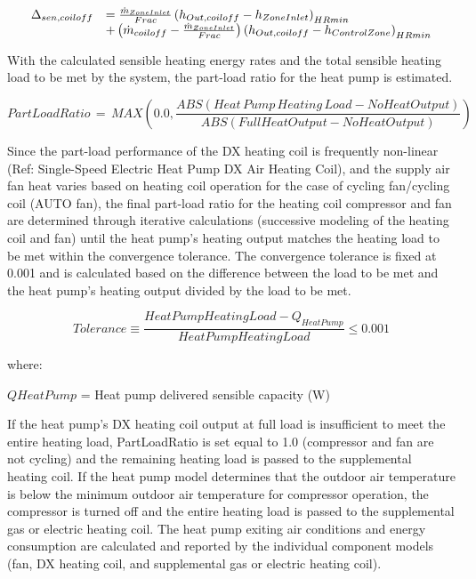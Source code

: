 \begin{equation}
  \begin{array}{rl}
    \Delta_{sen,coil off} &= \frac{\dot{m}_{ZoneInlet}}{Frac} \PB{h_{Out,coil off} - h_{ZoneInlet}}_{HRmin} \\
                           &+ \PB{\dot{m}_{coil off} - \frac{\dot{m}_{ZoneInlet}}{Frac}} \PB{h_{Out,coil off} - h_{ControlZone}}_{HRmin}
  \end{array}
\end{equation}

With the calculated sensible heating energy rates and the total sensible heating load to be met by the system, the part-load ratio for the heat pump is estimated.

\begin{equation}
PartLoadRatio\, = \,MAX\left( {0.0,\frac{{ABS\left( {Heat\,Pump\,Heating\,Load - NoHeatOutput} \right)}}{{ABS\left( {FullHeatOutput - NoHeatOutput} \right)}}} \right)
\end{equation}

Since the part-load performance of the DX heating coil is frequently non-linear (Ref: Single-Speed Electric Heat Pump DX Air Heating Coil), and the supply air fan heat varies based on heating coil operation for the case of cycling fan/cycling coil (AUTO fan), the final part-load ratio for the heating coil compressor and fan are determined through iterative calculations (successive modeling of the heating coil and fan) until the heat pump's heating output matches the heating load to be met within the convergence tolerance. The convergence tolerance is fixed at 0.001 and is calculated based on the difference between the load to be met and the heat pump's heating output divided by the load to be met.

\begin{equation}
  Tolerance \equiv \frac{HeatPumpHeatingLoad - Q_{HeatPump}}{HeatPumpHeatingLoad} \leq 0.001
\end{equation}

where:

\(QHeatPump\) = Heat pump delivered sensible capacity (W)

If the heat pump's DX heating coil output at full load is insufficient to meet the entire heating load, PartLoadRatio is set equal to 1.0 (compressor and fan are not cycling) and the remaining heating load is passed to the supplemental heating coil. If the heat pump model determines that the outdoor air temperature is below the minimum outdoor air temperature for compressor operation, the compressor is turned off and the entire heating load is passed to the supplemental gas or electric heating coil. The heat pump exiting air conditions and energy consumption are calculated and reported by the individual component models (fan, DX heating coil, and supplemental gas or electric heating coil).

